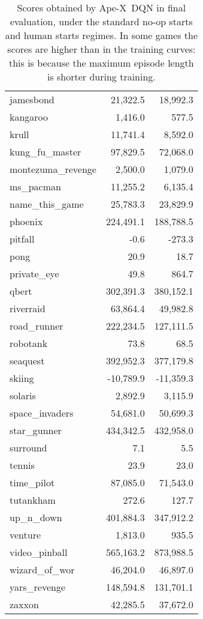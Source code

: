 \documentclass{article} \PassOptionsToPackage{usenames,dvipsnames}{xcolor}
\def\apex{Ape-X}
\def\smallcaption#1{\caption{\small #1}\vspace{-0.4cm}}
\begin{document}
\begin{table}
\begin{tabular}{lrr}
         jamesbond &   21,322.5 &   18,992.3 \\
          kangaroo &    1,416.0 &      577.5 \\
             krull &   11,741.4 &    8,592.0 \\
    kung\_fu\_master &   97,829.5 &   72,068.0 \\
 montezuma\_revenge &    2,500.0 &    1,079.0 \\
         ms\_pacman &   11,255.2 &    6,135.4 \\
    name\_this\_game &   25,783.3 &   23,829.9 \\
           phoenix &  224,491.1 &  188,788.5 \\
           pitfall &       -0.6 &     -273.3 \\
              pong &       20.9 &       18.7 \\
       private\_eye &       49.8 &      864.7 \\
             qbert &  302,391.3 &  380,152.1 \\
         riverraid &   63,864.4 &   49,982.8 \\
       road\_runner &  222,234.5 &  127,111.5 \\
          robotank &       73.8 &       68.5 \\
          seaquest &  392,952.3 &  377,179.8 \\
            skiing &  -10,789.9 &  -11,359.3 \\
           solaris &    2,892.9 &    3,115.9 \\
    space\_invaders &   54,681.0 &   50,699.3 \\
       star\_gunner &  434,342.5 &  432,958.0 \\
          surround &        7.1 &        5.5 \\
            tennis &       23.9 &       23.0 \\
        time\_pilot &   87,085.0 &   71,543.0 \\
         tutankham &      272.6 &      127.7 \\
         up\_n\_down &  401,884.3 &  347,912.2 \\
           venture &    1,813.0 &      935.5 \\
     video\_pinball &  565,163.2 &  873,988.5 \\
     wizard\_of\_wor &   46,204.0 &   46,897.0 \\
      yars\_revenge &  148,594.8 &  131,701.1 \\
            zaxxon &   42,285.5 &   37,672.0 \\
\bottomrule
\end{tabular}
\smallcaption{Scores obtained by \apex\ DQN in final evaluation, under the standard no-op starts and human starts regimes. In some games the scores are higher than in the training curves: this is because the maximum episode length is shorter during training.}
\end{table}
\end{document}
